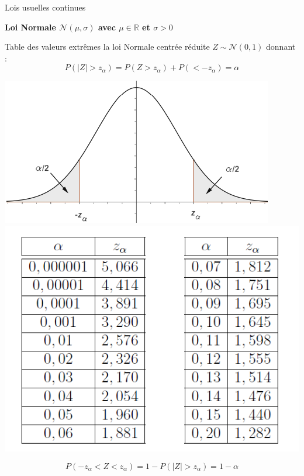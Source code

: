 \documentclass{beamer}
\begin{document}
\begin{frame}{Lois usuelles continues}

\begin{center}{\bf \Large Loi Normale $\mathcal{N}(\mu,\sigma)$ avec $\mu\in \mathbb{R}$ et $\sigma>0$} \end{center}

Table des valeurs extrêmes la loi Normale centrée réduite $Z\sim \mathcal{N}(0,1)$ donnant :
 $$P(|Z|>z_{\alpha}) = P(Z>z_{\alpha}) + P(<-z_{\alpha}) = \alpha$$

\includegraphics[scale=0.45]{images/LoiNcr_valeurs_extremes.png}
\includegraphics[scale=0.32]{images/table_norm_CR3.png}

$$P(-z_{\alpha}<Z<z_{\alpha}) = 1- P(|Z|>z_{\alpha}) = 1- \alpha$$

\end{frame}
\end{document}
